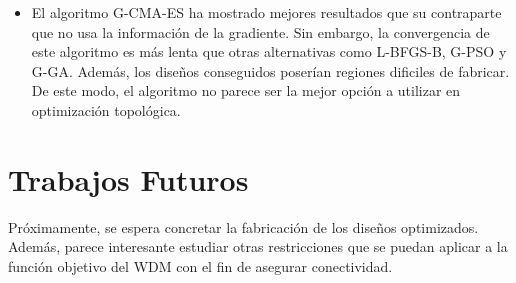 \begin{itemize}
  \item El algoritmo G-CMA-ES ha mostrado mejores resultados que su contraparte que no usa la información
        de la gradiente. Sin embargo, la convergencia de este algoritmo es más lenta que otras alternativas
        como L-BFGS-B, G-PSO y G-GA. Además, los diseños conseguidos poserían regiones dificiles de fabricar.
        De este modo, el algoritmo no parece ser la mejor opción a utilizar en optimización topológica.

\end{itemize}

\section{Trabajos Futuros}

Próximamente, se espera concretar la fabricación de los diseños optimizados.
Además, parece interesante estudiar otras restricciones que se puedan aplicar a la función
objetivo del WDM con el fin de asegurar conectividad.
